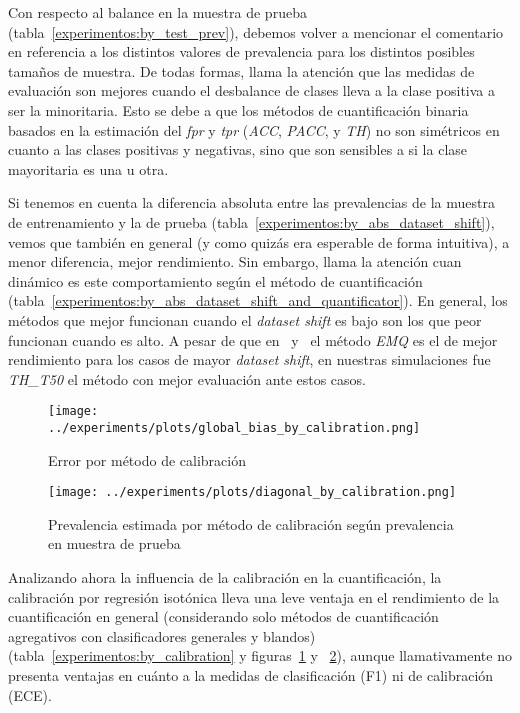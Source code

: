 Con respecto al balance en la muestra de prueba
(tabla~\ref{experimentos:by_test_prev}), debemos volver a mencionar el
comentario en referencia a los distintos valores de prevalencia para los
distintos posibles tamaños de muestra. De todas formas, llama la atención que
las medidas de evaluación son mejores cuando el desbalance de clases lleva a la
clase positiva a ser la minoritaria. Esto se debe a que los métodos de
cuantificación binaria basados en la estimación del {\it fpr\/} y {\it tpr\/}
({\it ACC}, {\it PACC}, y {\it TH\/}) no son simétricos en cuanto a las clases
positivas y negativas, sino que son sensibles a si la clase mayoritaria es una u
otra.

Si tenemos en cuenta la diferencia absoluta entre las prevalencias de la muestra
de entrenamiento y la de prueba (tabla~\ref{experimentos:by_abs_dataset_shift}),
vemos que también en general (y como quizás era esperable de forma intuitiva), a
menor diferencia, mejor rendimiento. Sin embargo, llama la atención cuan
dinámico es este comportamiento según el método de cuantificación
(tabla~\ref{experimentos:by_abs_dataset_shift_and_quantificator}). En general,
los métodos que mejor funcionan cuando el {\it dataset shift\/} es bajo son los
que peor funcionan cuando es alto. A pesar de que en~\citet{moreo2022tweet}
y~\citet{moreo2021quapy} el método {\it EMQ\/} es el de mejor rendimiento para
los casos de mayor {\it dataset shift}, en nuestras simulaciones fue {\it
TH\_T50\/} el método con mejor evaluación ante estos casos.

\begin{figure}[!tph]
    \centering
    \centerline{\texttt{[image: ../experiments/plots/global\_bias\_by\_calibration.png]}}
    \caption{Error por método de
    calibración}\label{fig:global_bias_by_calibration}
\end{figure}
\begin{figure}[!tph]
    \centering
    \centerline{\texttt{[image: ../experiments/plots/diagonal\_by\_calibration.png]}}
    \caption{Prevalencia estimada por método de calibración según prevalencia en
    muestra de prueba}\label{fig:diagonal_by_calibration}
\end{figure}

Analizando ahora la influencia de la calibración en la cuantificación, la
calibración por regresión isotónica lleva una leve ventaja en el rendimiento de
la cuantificación en general (considerando solo métodos de cuantificación
agregativos con clasificadores generales y blandos)
(tabla~\ref{experimentos:by_calibration} y
figuras~\ref{fig:global_bias_by_calibration} y
~\ref{fig:diagonal_by_calibration}), aunque llamativamente no presenta ventajas
en cuánto a la medidas de clasificación (F1) ni de calibración (ECE).

